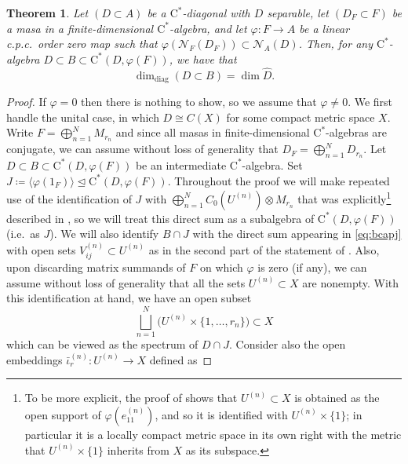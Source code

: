 \documentclass[11pt,a4paper]{amsart}
\newtheorem{theorem}{Theorem}[section]
\theoremstyle{definition}
\numberwithin{equation}{section}
\newcommand{\mc}[1]{\mathcal{#1}}
\begin{document}
\begin{theorem}\label{thm:subhom}
Let $(D\subset A)$ be a $\mathrm{C}^\ast$-diagonal with $D$ separable, let $(D_F\subset F)$ be a masa in a finite-dimensional $\mathrm{C}^\ast$-algebra, and let $\varphi\colon F\to A$ be a linear c.p.c.\ order zero map such that $\varphi(\mc{N}_F(D_F))\subset\mc{N}_A(D)$. Then, for any $\mathrm{C}^\ast$-algebra $D\subset B\subset \mathrm{C}^\ast(D,\varphi(F))$, we have that
\begin{equation}
\dim_{\mathrm{diag}}(D\subset B)=\dim\widehat{D}.
\end{equation}
\end{theorem}

\begin{proof}
If $\varphi=0$ then there is nothing to show, so we assume that $\varphi\ne0$. We first handle the unital case, in which $D\cong C(X)$ for some compact metric space $X$. Write $F= \bigoplus_{n=1}^NM_{r_n}$ and since all masas in finite-dimensional $\mathrm{C}^\ast$-algebras are conjugate, we can assume without loss of generality that $D_F = \bigoplus_{n=1}^ND_{r_n}$. Let $D\subset B\subset \mathrm{C}^\ast(D,\varphi(F))$ be an intermediate $\mathrm{C}^\ast$-algebra. Set $J\coloneqq\langle\varphi(1_F)\rangle\trianglelefteq\mathrm{C}^\ast(D,\varphi(F))$. Throughout the proof we will make repeated use of the identification of $J$ with $\bigoplus_{n=1}^NC_0(U^{(n)})\otimes M_{r_n}$ that was explicitly\footnote{To be more explicit, the proof of  shows that $U^{(n)}\subset X$ is obtained as the open support of $\varphi(e_{11}^{(n)})$, and so it is identified with $U^{(n)}\times\{1\}$; in particular it is a locally compact metric space in its own right with the metric that $U^{(n)}\times\{1\}$ inherits from $X$ as its subspace.} described in , so we will treat this direct sum as a subalgebra of $\mathrm{C}^\ast(D,\varphi(F))$ (i.e.\ as $J$). We will also identify $B\cap J$ with the direct sum appearing in \eqref{eq:bcapj} with open sets $V_{ij}^{(n)}\subset U^{(n)}$ as in the second part of the statement of . Also, upon discarding matrix summands of $F$ on which $\varphi$ is zero (if any), we can assume without loss of generality that all the sets $U^{(n)}\subset X$ are nonempty. With this identification at hand, we have an open subset
\begin{equation}\label{eq:opensubset}
\bigsqcup_{n=1}^N\big(U^{(n)}\times\{1,\dots,r_n\}\big)\subset X
\end{equation}
which can be viewed as the spectrum of $D\cap J$. Consider also the open embeddings $\bar\iota_r^{(n)}\colon U^{(n)}\to X$ defined as 

\end{proof}
\end{document}
